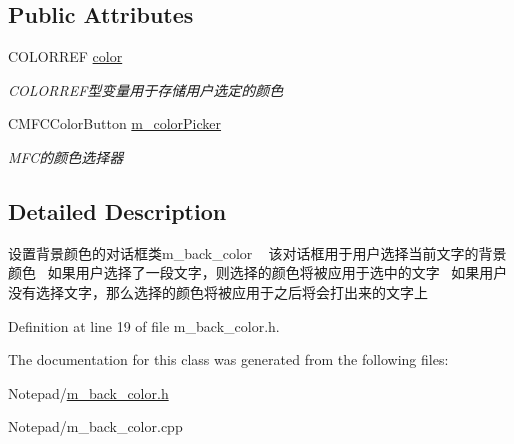 \subsection*{Public Attributes}
\begin{DoxyCompactItemize}
\item 
\mbox{\label{classm__back__color_ac1de7ac7d78c1ce0068efae4e525079f}} 
C\+O\+L\+O\+R\+R\+EF \hyperlink{classm__back__color_ac1de7ac7d78c1ce0068efae4e525079f}{color}
\begin{DoxyCompactList}\small\item\em C\+O\+L\+O\+R\+R\+E\+F型变量用于存储用户选定的颜色 \end{DoxyCompactList}\item 
\mbox{\label{classm__back__color_a0d303193f0f805864c094b116191fec9}} 
C\+M\+F\+C\+Color\+Button \hyperlink{classm__back__color_a0d303193f0f805864c094b116191fec9}{m\+\_\+color\+Picker}
\begin{DoxyCompactList}\small\item\em M\+F\+C的颜色选择器 \end{DoxyCompactList}\end{DoxyCompactItemize}


\subsection{Detailed Description}
设置背景颜色的对话框类m\+\_\+back\+\_\+color ~\newline
该对话框用于用户选择当前文字的背景颜色~\newline
如果用户选择了一段文字，则选择的颜色将被应用于选中的文字~\newline
如果用户没有选择文字，那么选择的颜色将被应用于之后将会打出来的文字上~\newline


Definition at line 19 of file m\+\_\+back\+\_\+color.\+h.



The documentation for this class was generated from the following files\+:\begin{DoxyCompactItemize}
\item 
Notepad/\hyperlink{m__back__color_8h}{m\+\_\+back\+\_\+color.\+h}\item 
Notepad/m\+\_\+back\+\_\+color.\+cpp\end{DoxyCompactItemize}
